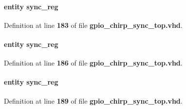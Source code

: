 \paragraph[{sync\+\_\+reg0}]{ {\bfseries \textcolor{keywordflow}{entity}\textcolor{vhdlchar}{ }\textcolor{vhdlchar}{sync\+\_\+reg}\textcolor{vhdlchar}{ }} \hspace{0.3cm}{\ttfamily [Instantiation]}}\label{classgpio__chirp__sync__top_1_1arch_a6d0f2de0bd56b397adfb1e48896e42ef}


Definition at line {\bf 183} of file {\bf gpio\+\_\+chirp\+\_\+sync\+\_\+top.\+vhd}.

\paragraph[{sync\+\_\+reg1}]{ {\bfseries \textcolor{keywordflow}{entity}\textcolor{vhdlchar}{ }\textcolor{vhdlchar}{sync\+\_\+reg}\textcolor{vhdlchar}{ }} \hspace{0.3cm}{\ttfamily [Instantiation]}}\label{classgpio__chirp__sync__top_1_1arch_a8fc8454c91408892606d3cf049de8638}


Definition at line {\bf 186} of file {\bf gpio\+\_\+chirp\+\_\+sync\+\_\+top.\+vhd}.

\paragraph[{sync\+\_\+reg2}]{ {\bfseries \textcolor{keywordflow}{entity}\textcolor{vhdlchar}{ }\textcolor{vhdlchar}{sync\+\_\+reg}\textcolor{vhdlchar}{ }} \hspace{0.3cm}{\ttfamily [Instantiation]}}\label{classgpio__chirp__sync__top_1_1arch_acd983ae79613adccfa068b86d26343cf}


Definition at line {\bf 189} of file {\bf gpio\+\_\+chirp\+\_\+sync\+\_\+top.\+vhd}.


